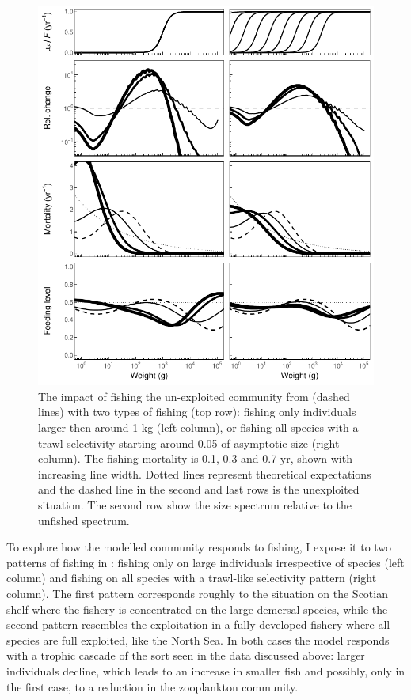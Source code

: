 \afterpage{\clearpage}
\begin{figure}[p]
  \centering
  \includegraphics{ChapterCommunityFishing/Cascades.pdf}
  \caption{The impact of fishing the un-exploited community from  (dashed lines) with two types of fishing (top row): fishing only individuals larger then around 1 kg (left column), or fishing all species with a trawl selectivity starting around 0.05 of asymptotic size (right column).  The fishing mortality is 0.1, 0.3 and 0.7 yr\per, shown with increasing line width.  Dotted lines represent theoretical expectations and the dashed line in the second and last rows is the unexploited situation.  The second row show the size spectrum relative to the unfished spectrum.}
  \label{fig:Cascades}
\end{figure}
 
To explore how the modelled community responds to fishing, I expose it to two patterns of fishing in : fishing only on large individuals irrespective of species (left column) and fishing on all species with a trawl-like selectivity pattern (right column).  The first pattern corresponds roughly to the situation on the Scotian shelf where the fishery is concentrated on the large demersal species, while the second pattern resembles the exploitation in a fully developed fishery where all species are full exploited, like the North Sea.  In both cases the model responds with a trophic cascade of the sort seen in the data discussed above: larger individuals decline, which leads to an increase in smaller fish and possibly, only in the first case, to a reduction in the zooplankton community.  

